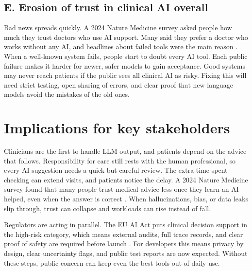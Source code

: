 \documentclass[12pt,a4paper]{scrreprt}
\begin{document}
\subsection*{E. Erosion of trust in clinical AI overall}
Bad news spreads quickly. A 2024 Nature Medicine survey asked people how much they trust doctors who use AI support. Many said they prefer a doctor who works without any AI, and headlines about failed tools were the main reason \autocite{Trust}. When a well-known system fails, people start to doubt every AI tool. Each public failure makes it harder for newer, safer models to gain acceptance. Good systems may never reach patients if the public sees all clinical AI as risky. Fixing this will need strict testing, open sharing of errors, and clear proof that new language models avoid the mistakes of the old ones.


\section*{Implications for key stakeholders}
Clinicians are the first to handle LLM output, and patients depend on the advice that follows. Responsibility for care still rests with the human professional, so every AI suggestion needs a quick but careful review. The extra time spent checking can extend visits, and patients notice the delay. A 2024 Nature Medicine survey found that many people trust medical advice less once they learn an AI helped, even when the answer is correct \autocite{Advice}. When hallucinations, bias, or data leaks slip through, trust can collapse and workloads can rise instead of fall.\par
\vspace{\baselineskip}
\noindent
Regulators are acting in parallel. The EU AI Act puts clinical decision support in the high-risk category, which means external audits, full trace records, and clear proof of safety are required before launch \autocite{EUAIAct}. For developers this means privacy by design, clear uncertainty flags, and public test reports are now expected. Without these steps, public concern can keep even the best tools out of daily use.
\end{document}
